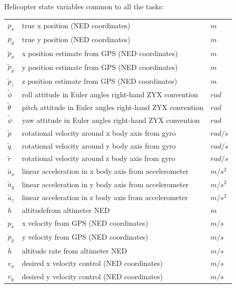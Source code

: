 \documentclass[a4paper,11pt]{report}
\begin{document}
Helicopter state variables common to all the tasks:
\begin{table}[h]  
\begin{tabular}{l l l}
     $p_x$ & true x position (NED coordinates)            & $m$\\
     $p_y$ & true y position (NED coordinates)            & $m$\\
     $\tilde{p}_x$ & x position estimate from GPS (NED coordinates)            & $m$\\
     $\tilde{p}_y$ & y position estimate from GPS (NED coordinates)            & $m$\\
     $\tilde{p}_z$ & z position estimate from GPS (NED coordinates)            & $m$\\
     $\tilde{\phi}$ & roll attitude in Euler angles right-hand ZYX convention & $rad$\\
     $\tilde{\theta}$ & pitch attitude in Euler angles right-hand ZYX convention& $rad$\\
     $\tilde{\psi}$ & yaw attitude in Euler angles right-hand ZYX convention  & $rad$\\
     $\tilde{p}$  & rotational velocity around x body axis from gyro                 & $rad/s$\\ 
     $\tilde{q}$  & rotational velocity around y body axis from gyro                 & $rad/s$\\ 
     $\tilde{r}$  & rotational velocity around z body axis from gyro                & $rad/s$\\
     $\tilde{a}_x$ & linear acceleration in x body axis from accelerometer            & $m/s^2$\\
     $\tilde{a}_y$ & linear acceleration in y body axis from accelerometer             & $m/s^2$\\
     $\tilde{a}_z$ & linear acceleration in z body axis from accelerometer             & $m/s^2$\\
     $h$& altitude\footnotemark  from altimeter NED & $m$\\
     $\dot{p}_x$ & x velocity from GPS (NED coordinates)            & $m/s$\\
     $\dot{p}_y$ & y velocity from GPS (NED coordinates)            & $m/s$\\
     $\dot{h}$    & altitude rate from altimeter NED                   & $m/s$\\
     $v_x$ & desired x velocity control (NED coordinates)            & $m/s$\\ 
     $v_y$ & desired y velocity control (NED coordinates)            & $m/s$\\
\end{tabular}
\end{table}
\end{document}
